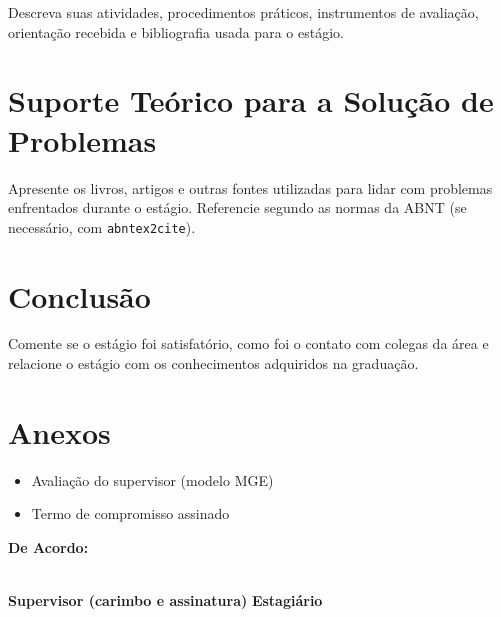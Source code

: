 \documentclass[12pt,a4paper]{article}
\begin{document}
	Descreva suas atividades, procedimentos práticos, instrumentos de avaliação, orientação recebida e bibliografia usada para o estágio.
	
	\section{Suporte Teórico para a Solução de Problemas}
	
	Apresente os livros, artigos e outras fontes utilizadas para lidar com problemas enfrentados durante o estágio. Referencie segundo as normas da ABNT (se necessário, com \texttt{abntex2cite}).
	
	\section{Conclusão}
	
	Comente se o estágio foi satisfatório, como foi o contato com colegas da área e relacione o estágio com os conhecimentos adquiridos na graduação.
	
	\section{Anexos}
	
	\begin{itemize}
		\item Avaliação do supervisor (modelo MGE)
		\item Termo de compromisso assinado
	\end{itemize}
	
	\vspace{2cm}
	\noindent \textbf{De Acordo:}
	
	\vspace{2cm}
	\noindent \underline{\hspace{7cm}} \hfill \underline{\hspace{7cm}} \\
	\textbf{Supervisor (carimbo e assinatura)} \hfill \textbf{Estagiário}
	
\end{document}
